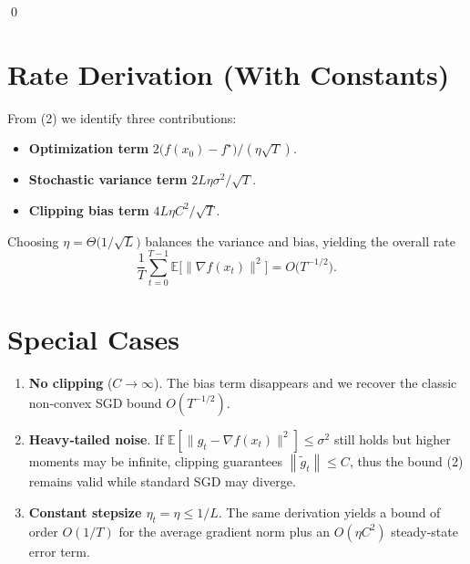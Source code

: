 \documentclass{article}
\newcommand{\E}{\mathbb{E}}
\newcommand{\norm}[1]{\left\lVert #1\right\rVert}
\begin{document}
\qed

\section*{Rate Derivation (With Constants)}
From (2) we identify three contributions:
\begin{itemize}
    \item \textbf{Optimization term} $2\bigl(f(x_0)-f^\star\bigr)/(\eta\sqrt{T})$.
    \item \textbf{Stochastic variance term} $2L\eta\sigma^{2}/\sqrt{T}$.
    \item \textbf{Clipping bias term} $4L\eta C^{2}/\sqrt{T}$.
\end{itemize}
Choosing $\eta = \Theta\bigl(1/\sqrt{L}\bigr)$ balances the variance and bias, yielding the overall rate
\[
\frac{1}{T}\sum_{t=0}^{T-1}\E\!\bigl[\|\nabla f(x_t)\|^{2}\bigr]=O\!\bigl(T^{-1/2}\bigr).
\]

\section*{Special Cases}
\begin{enumerate}[label=\arabic*.]
    \item \textbf{No clipping} ($C\to\infty$). The bias term disappears and we recover the classic non‑convex SGD bound $O(T^{-1/2})$.
    \item \textbf{Heavy‑tailed noise}. If $\E[\|g_t-\nabla f(x_t)\|^{2}]\le\sigma^{2}$ still holds but higher moments may be infinite, clipping guarantees $\norm{\tilde g_t}\le C$, thus the bound (2) remains valid while standard SGD may diverge.
    \item \textbf{Constant stepsize $\eta_t=\eta\le 1/L$}. The same derivation yields a bound of order $O(1/T)$ for the average gradient norm plus an $O(\eta C^{2})$ steady‑state error term.
\end{enumerate}
\end{document}
